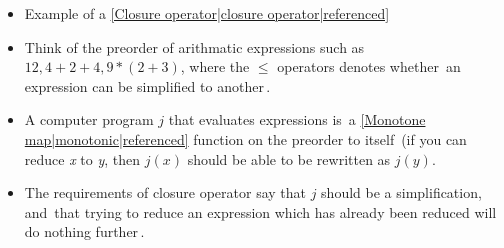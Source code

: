 

\begin{itemize}
    \item Example of a \ref{Closure operator|closure operator|referenced}
    \item Think of the preorder of arithmatic expressions such as $12, 4+2+4, 9*(2+3)$, where the $\leq$ operators denotes whether \,an expression can be simplified to another\,.
    \item A computer program $j$ that evaluates expressions is \,a \ref{Monotone map|monotonic|referenced} function on the preorder to itself\, (if you can reduce \emph{x} to \emph{y}, then $j(x)$ should be able to be rewritten as $j(y)$.
    \item The requirements of closure operator say that $j$ should be a simplification, and \,that trying to reduce an expression which has already been reduced will do nothing further\,.
  \end{itemize}